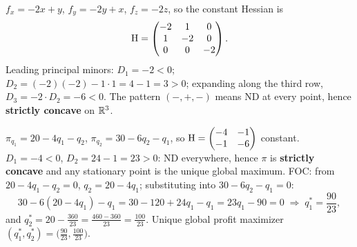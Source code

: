 \begin{solutions}
  \item $f_x=-2x+y$, $f_y=-2y+x$, $f_z=-2z$, so the constant Hessian is
        \[
          \operatorname{H}=\begin{pmatrix}-2&1&0\\1&-2&0\\0&0&-2\end{pmatrix}.
        \]
        Leading principal minors: $D_1=-2<0$;
        $D_2=(-2)(-2)-1\cdot1=4-1=3>0$; expanding along the third row,
        $D_3=-2\cdot D_2=-6<0$. The pattern $(-,+,-)$ means ND at every
        point, hence \textbf{strictly concave} on $\mathbb{R}^{3}$.

  \item $\pi_{q_1}=20-4q_1-q_2$, $\pi_{q_2}=30-6q_2-q_1$, so
        $\operatorname{H}=\begin{pmatrix}-4&-1\\-1&-6\end{pmatrix}$ constant.
        $D_1=-4<0$, $D_2=24-1=23>0$: ND everywhere, hence $\pi$ is
        \textbf{strictly concave} and any stationary point is the unique
        global maximum. FOC: from $20-4q_1-q_2=0$, $q_2=20-4q_1$;
        substituting into $30-6q_2-q_1=0$:
        \[
          30-6(20-4q_1)-q_1 = 30-120+24q_1-q_1 = 23q_1-90 = 0
          \;\Rightarrow\; q_1^{*}=\frac{90}{23},
        \]
        and $q_2^{*}=20-\frac{360}{23}=\frac{460-360}{23}=\frac{100}{23}$.
        Unique global profit maximizer
        $(q_1^{*},q_2^{*})=\bigl(\tfrac{90}{23},\tfrac{100}{23}\bigr)$.


\end{solutions}

